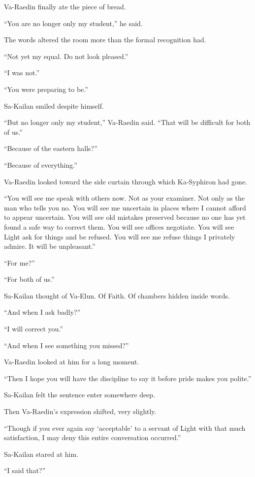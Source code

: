 Va-Raedin finally ate the piece of bread.\par
“You are no longer only my student,” he said.\par
The words altered the room more than the formal recognition had.\par
“Not yet my equal. Do not look pleased.”\par
“I was not.”\par
“You were preparing to be.”\par
Sa-Kailan smiled despite himself.\par
“But no longer only my student,” Va-Raedin said. “That will be difficult for both of us.”\par
“Because of the eastern halls?”\par
“Because of everything.”\par
Va-Raedin looked toward the side curtain through which Ka-Syphiron had gone.\par
“You will see me speak with others now. Not as your examiner. Not only as the man who tells you no. You will see me uncertain in places where I cannot afford to appear uncertain. You will see old mistakes preserved because no one has yet found a safe way to correct them. You will see offices negotiate. You will see Light ask for things and be refused. You will see me refuse things I privately admire. It will be unpleasant.”\par
“For me?”\par
“For both of us.”\par
Sa-Kailan thought of Va-Elun. Of Faith. Of chambers hidden inside words.\par
“And when I ask badly?”\par
“I will correct you.”\par
“And when I see something you missed?”\par
Va-Raedin looked at him for a long moment.\par
“Then I hope you will have the discipline to say it before pride makes you polite.”\par
Sa-Kailan felt the sentence enter somewhere deep.\par
Then Va-Raedin’s expression shifted, very slightly.\par
“Though if you ever again say ‘acceptable’ to a servant of Light with that much satisfaction, I may deny this entire conversation occurred.”\par
Sa-Kailan stared at him.\par
“I said that?”\par
